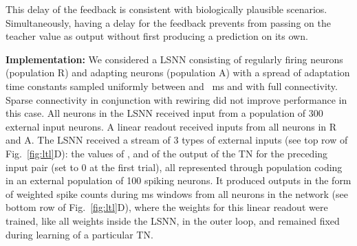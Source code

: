 \documentclass{article} \pdfoutput=1
\begin{document}
This delay of the feedback is consistent with biologically plausible scenarios. 
Simultaneously, having a delay for the feedback prevents  from passing on the teacher value as output without first producing a prediction on its own.


\textbf{Implementation:}
We considered a LSNN  consisting of  regularly firing neurons (population R) and  adapting neurons (population A)
with a spread of adaptation time constants sampled uniformly between  and ~ms and with full connectivity.
Sparse connectivity in conjunction with rewiring did not improve performance in this case.
All neurons in the LSNN received input from a population  of 300 external input neurons.
A linear readout received inputs from all neurons in R and A.
The LSNN received a stream of 3 types of external inputs (see top row of Fig.~\ref{fig:ltl}D): the values of , and of the output  of the TN for the preceding input pair  (set to 0 at the first trial), all represented through population coding in an external population of 100 spiking neurons.
It produced outputs in the form of weighted spike counts during  ms windows from all neurons in the network (see bottom row of Fig.~\ref{fig:ltl}D), where the weights for this linear readout were trained, like all weights inside the LSNN, in the outer loop, and remained fixed during learning of a particular TN. 
\end{document}

